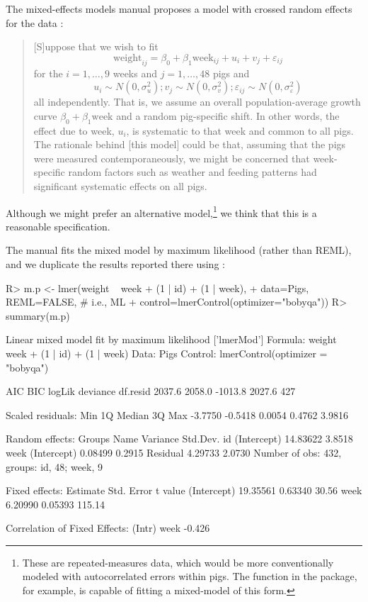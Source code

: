 \documentclass[
]{jss}
\begin{document}
The  mixed-effects models manual proposes a model with
crossed random effects for the  data \citep[ page
37]{Stata:2023}:

\begin{quote}
{[}S{]}uppose that we wish to fit \[
\mathrm{weight}_{ij} = \beta_0 + \beta_1 \mathrm{week}_{ij} + u_i + v_j + \varepsilon_{ij} 
\] for the \(i = 1, \ldots, 9\) weeks and \(j = 1, \dots, 48\) pigs and
\[
u_i \sim N(0, \sigma^2_u); v_j \sim N(0, \sigma^2_v ); \varepsilon_{ij} \sim N(0, \sigma^2_\varepsilon)
\] all independently. That is, we assume an overall population-average
growth curve \(\beta_0 + \beta_1 \mathrm{week}\) and a random
pig-specific shift. In other words, the effect due to week, \(u_i\), is
systematic to that week and common to all pigs. The rationale behind
{[}this model{]} could be that, assuming that the pigs were measured
contemporaneously, we might be concerned that week-specific random
factors such as weather and feeding patterns had significant systematic
effects on all pigs.
\end{quote}

Although we might prefer an alternative model,\footnote{These are
  repeated-measures data, which would be more conventionally modeled
  with autocorrelated errors within pigs. The  function in
  the  package, for example, is capable of fitting a
  mixed-model of this form.} we think that this is a reasonable
specification.

The  manual fits the mixed model by maximum likelihood
(rather than REML), and we duplicate the results reported there using
:

\begin{CodeChunk}
\begin{CodeInput}
R> m.p <- lmer(weight ~ week + (1 | id) + (1 | week),
+             data=Pigs, REML=FALSE, # i.e., ML
+             control=lmerControl(optimizer="bobyqa"))
R> summary(m.p)
\end{CodeInput}
\begin{CodeOutput}
Linear mixed model fit by maximum likelihood  ['lmerMod']
Formula: weight ~ week + (1 | id) + (1 | week)
   Data: Pigs
Control: lmerControl(optimizer = "bobyqa")

     AIC      BIC   logLik deviance df.resid 
  2037.6   2058.0  -1013.8   2027.6      427 

Scaled residuals: 
    Min      1Q  Median      3Q     Max 
-3.7750 -0.5418  0.0054  0.4762  3.9816 

Random effects:
 Groups   Name        Variance Std.Dev.
 id       (Intercept) 14.83622 3.8518  
 week     (Intercept)  0.08499 0.2915  
 Residual              4.29733 2.0730  
Number of obs: 432, groups:  id, 48; week, 9

Fixed effects:
            Estimate Std. Error t value
(Intercept) 19.35561    0.63340   30.56
week         6.20990    0.05393  115.14

Correlation of Fixed Effects:
     (Intr)
week -0.426
\end{CodeOutput}
\end{CodeChunk}
\end{document}
